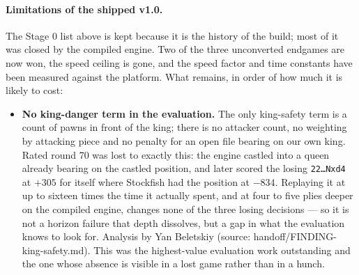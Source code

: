 \documentclass[11pt,a4paper]{article}
\newcommand{\src}[1]{{\small(source: #1)}}
\newcommand{\code}[1]{\texttt{#1}}
\begin{document}
\paragraph{Limitations of the shipped v1.0.} The Stage 0 list above is kept because it is the history of
the build; most of it was closed by the compiled engine. Two of the three unconverted endgames are now
won, the speed ceiling is gone, and the speed factor and time constants have been measured against the
platform. What remains, in order of how much it is likely to cost:

\begin{itemize}[nosep]
  \item \textbf{No king-danger term in the evaluation.} The only king-safety term is a count of pawns in
        front of the king; there is no attacker count, no weighting by attacking piece and no penalty for
        an open file bearing on our own king. Rated round 70 was lost to exactly this: the engine castled
        into a queen already bearing on the castled position, and later scored the losing
        \code{22\ldots Nxd4} at $+305$ for itself where Stockfish had the position at $-834$. Replaying
        it at up to sixteen times the time it actually spent, and at four to five plies deeper on the
        compiled engine, changes none of the three losing decisions --- so it is not a horizon failure
        that depth dissolves, but a gap in what the evaluation knows to look for. Analysis by Yan
        Beletskiy \src{handoff/FINDING-king-safety.md}. This was the highest-value evaluation work
        outstanding and the one whose absence is visible in a lost game rather than in a hunch.


\end{itemize}
\end{document}
